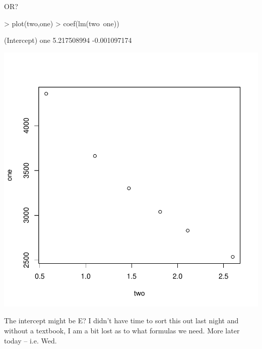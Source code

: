 \documentclass{article}
\begin{document}
OR?

\begin{Schunk}
\begin{Sinput}
> plot(two,one)
> coef(lm(two~one))
\end{Sinput}
\begin{Soutput}
 (Intercept)          one 
 5.217508994 -0.001097174 
\end{Soutput}
\end{Schunk}
\includegraphics{Chemistry1-004}

The intercept might be E?  I didn't have time to sort this out last night and without a textbook, I am a bit lost as to what formulas we need. More later today -- i.e. Wed.
\end{document}
